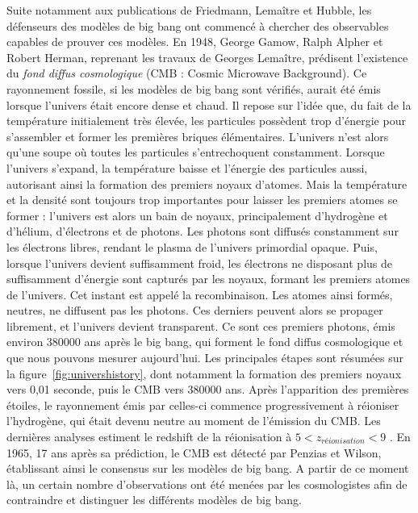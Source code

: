 Suite notamment aux publications de Friedmann, Lemaître et Hubble, les défenseurs des modèles de big bang ont commencé à chercher des observables capables de prouver ces modèles. En 1948, George Gamow, Ralph Alpher et Robert Herman, reprenant les travaux de Georges Lemaître, prédisent l'existence du \emph{fond diffus cosmologique} (CMB : Cosmic Microwave Background). Ce rayonnement fossile, si les modèles de big bang sont vérifiés, aurait été émis lorsque l'univers était encore dense et chaud. Il repose sur l'idée que, du fait de la température initialement très élevée, les particules possèdent trop d'énergie pour s'assembler et former les premières briques élémentaires. L'univers n'est alors qu'une soupe où toutes les particules s'entrechoquent constamment. Lorsque l'univers s'expand, la température baisse et l'énergie des particules aussi, autorisant ainsi la formation des premiers noyaux d'atomes. Mais la température et la densité sont toujours trop importantes pour laisser les premiers atomes se former : l'univers est alors un bain de noyaux, principalement d'hydrogène et d'hélium, d'électrons et de photons. Les photons sont diffusés constamment sur les électrons libres, rendant le plasma de l'univers primordial opaque. Puis, lorsque l'univers devient suffisamment froid, les électrons ne disposant plus de suffisamment d'énergie sont capturés par les noyaux, formant les premiers atomes de l'univers. Cet instant est appelé la recombinaison. Les atomes ainsi formés, neutres, ne diffusent pas les photons. Ces derniers peuvent alors se propager librement, et l'univers devient transparent. Ce sont ces premiers photons, émis environ \num{380000} ans après le big bang, qui forment le fond diffus cosmologique et que nous pouvons mesurer aujourd'hui. Les principales étapes sont résumées sur la figure~\ref{fig:univershistory}, dont notamment la formation des premiers noyaux vers 0,01 seconde, puis le CMB vers \num{380000} ans.
Après l'apparition des premières étoiles, le rayonnement émis par celles-ci commence progressivement à réioniser l'hydrogène, qui était devenu neutre au moment de l'émission du CMB. Les dernières analyses estiment le redshift de la réionisation à $5 < z_{réionisation} < 9$ \autocite{Collaboration2018}.
En 1965, 17 ans après sa prédiction, le CMB est détecté par Penzias et Wilson, établissant ainsi le consensus sur les modèles de big bang. A partir de ce moment là, un certain nombre d'observations ont été menées par les cosmologistes afin de contraindre et distinguer les différents modèles de big bang.
